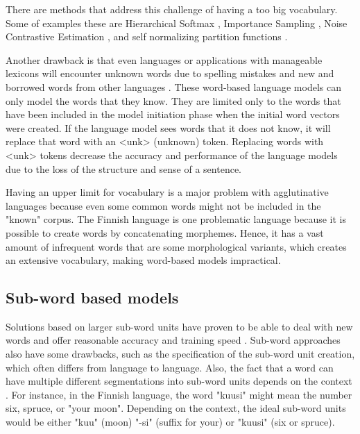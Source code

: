 There are methods that address this challenge of having a too big vocabulary. Some of examples these are Hierarchical Softmax \parencite{morin2005hierarchical}, Importance Sampling \parencite{bengio2003quick}, Noise Contrastive Estimation \parencite{gutmann2010noise,mnih2013learning}, and self normalizing partition functions \parencite{de2015exploration}.

Another drawback is that even languages or applications with manageable lexicons will encounter unknown words due to spelling mistakes and new and borrowed words from other languages \parencite{jurafsky2014speech}. These word-based language models can only model the words that they know. They are limited only to the words that have been included in the model initiation phase when the initial word vectors were created. If the language model sees words that it does not know, it will replace that word with an <unk> (unknown) token. Replacing words with <unk> tokens decrease the accuracy and performance of the language models due to the loss of the structure and sense of a sentence. 

Having an upper limit for vocabulary is a major problem with agglutinative languages because even some common words might not be included in the "known" corpus. The Finnish language is one problematic language because it is possible to create words by concatenating morphemes. Hence, it has a vast amount of infrequent words that are some morphological variants, which creates an extensive vocabulary, making word-based models impractical. \parencite{kurimo2006unlimited}

\subsection{Sub-word based models}
Solutions based on larger sub-word units have proven to be able to deal with new words and offer reasonable accuracy and training speed \parencite{mikolov2012statistical}. Sub-word approaches also have some drawbacks, such as the specification of the sub-word unit creation, which often differs from language to language. Also, the fact that a word can have multiple different segmentations into sub-word units depends on the context \parencite{bojanowski2015alternative}. For instance, in the Finnish language, the word "kuusi" might mean the number six, spruce, or "your moon". Depending on the context, the ideal sub-word units would be either "kuu" (moon) "-si" (suffix for your) or "kuusi" (six or spruce). 


